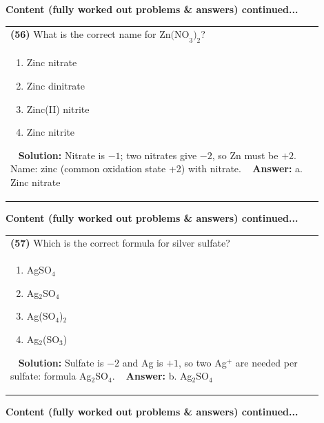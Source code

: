 \documentclass{article}
\begin{document}
{\newpage
\noindent
{\large\textbf{Content (fully worked out problems & answers) continued...}}\\[0.2em]
\begin{tabular}{|p{0.9\linewidth}|}
\hline
\vspace{0.2cm}
\textbf{(56)} What is the correct name for $\text{Zn(NO}_3)_2$? \\
\begin{minipage}[t]{0.85\linewidth}
\begin{enumerate}[label=\alph*.]
\item Zinc nitrate \
\item Zinc dinitrate \
\item Zinc(II) nitrite \
\item Zinc nitrite
\end{enumerate}
\end{minipage}\
\hline
\vspace{0.2cm}
\textbf{Solution:} Nitrate is $-1$; two nitrates give $-2$, so Zn must be $+2$. Name: zinc (common oxidation state +2) with nitrate. \
\hline
\vspace{0.2cm}
\textbf{Answer:} a. Zinc nitrate \
\hline
\end{tabular}
\newpage
\noindent
{\large\textbf{Content (fully worked out problems & answers) continued...}}\\[0.2em]
\begin{tabular}{|p{0.9\linewidth}|}
\hline
\vspace{0.2cm}
\textbf{(57)} Which is the correct formula for silver sulfate? \\
\begin{minipage}[t]{0.85\linewidth}
\begin{enumerate}[label=\alph*.]
\item AgSO$_4$ \
\item Ag$_2$SO$_4$ \
\item Ag(SO$_4$)$_2$ \
\item Ag$_2$(SO$_3$)
\end{enumerate}
\end{minipage}\
\hline
\vspace{0.2cm}
\textbf{Solution:} Sulfate is $-2$ and Ag is $+1$, so two Ag$^+$ are needed per sulfate: formula Ag$_2$SO$_4$. \
\hline
\vspace{0.2cm}
\textbf{Answer:} b. Ag$_2$SO$_4$ \
\hline
\end{tabular}
\newpage
\noindent
{\large\textbf{Content (fully worked out problems & answers) continued...}}\\[0.2em]
}
\end{document}
